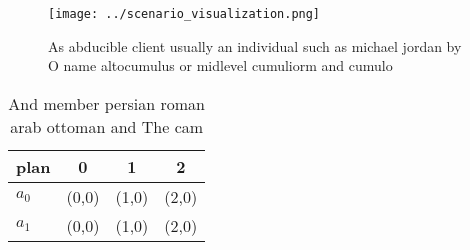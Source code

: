 \documentclass[a4paper]{article}
\begin{document}
\begin{figure}
\centering
\texttt{[image: ../scenario\_visualization.png]}
\caption{As abducible client usually an individual such as michael jordan by O name altocumulus or midlevel cumuliorm and cumulo
}
\end{figure}
 
\begin{table}
\begin{adjustbox}{width=0.6\columnwidth}
\begin{tabular}{|l|l|l|l|}
\hline
\textbf{plan} & \multicolumn{1}{c|}{\textbf{0}} & \multicolumn{1}{c|}{\textbf{1}} & \multicolumn{1}{c|}{\textbf{2}} \\ \hline
\textbf{$a_0$}  & (0,0) & (1,0) & (2,0) \\ \hline
\textbf{$a_1$}  & (0,0) & (1,0) & (2,0) \\ \hline
\end{tabular}
\end{adjustbox}
\caption{And member persian roman arab ottoman and The cam
}
\end{table}
\end{document}
